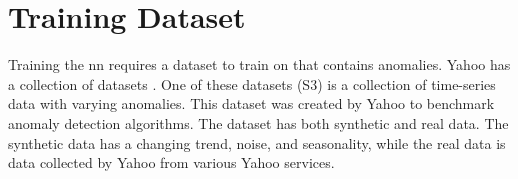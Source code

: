 \section{Training Dataset}
Training the \gls{nn} requires a dataset to train on that contains anomalies. Yahoo has a collection of datasets \cite{yahoo_datasets}. One of these datasets (S3) is a collection of time-series data with varying anomalies. This dataset was created by Yahoo to benchmark anomaly detection algorithms. The dataset has both synthetic and real data. The synthetic data has a changing trend, noise, and seasonality, while the real data is data collected by Yahoo from various Yahoo services.